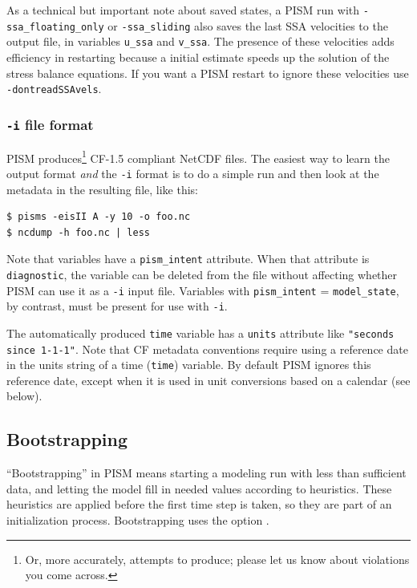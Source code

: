 As a technical but important note about saved states, a PISM run with \texttt{-ssa_floating_only} or \texttt{-ssa_sliding}
also saves the last SSA velocities to the output file, in variables 
\texttt{u_ssa} and \texttt{v_ssa}.  The presence
of these velocities adds efficiency in restarting because a initial estimate speeds up the solution of the stress balance equations.  If you want a PISM restart to
ignore these velocities use \texttt{-dontreadSSAvels}.

\subsubsection*{\texttt{-i} file format}
\label{sec:i-format}
PISM produces\footnote{Or, more accurately, attempts to produce; please let us know about violations you come across.} CF-1.5 compliant NetCDF files.  The easiest way to learn the output format \emph{and} the \texttt{-i} format is to do a simple run and then look at the metadata in the resulting file, like this:
\begin{verbatim}
$ pisms -eisII A -y 10 -o foo.nc
$ ncdump -h foo.nc | less
\end{verbatim}

Note that variables have a \texttt{pism_intent} attribute.  When that attribute is \texttt{diagnostic}, the variable can be deleted from the file without affecting whether PISM can use it as a \texttt{-i} input file.  Variables with \texttt{pism_intent} = \texttt{model_state}, by contrast, must be present for use with \texttt{-i}.

The automatically produced \texttt{time} variable has a \texttt{units} attribute like \texttt{"seconds since 1-1-1"}.  Note that CF metadata conventions require using a reference date in the units string of a time (\texttt{time}) variable. By default PISM ignores this reference date, except when it is used in unit conversions based on a calendar (see below).


\subsection{Bootstrapping}
\label{sec:bootstrapping}

``Bootstrapping'' in PISM means starting a modeling run with less than sufficient data, and letting the model fill in needed values according to heuristics.  These heuristics are applied before the first time step is taken, so they are part of an initialization process.  Bootstrapping uses the option .

